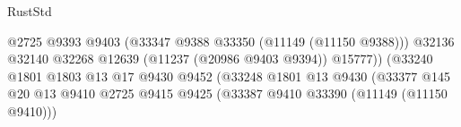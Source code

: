 \begin{lexlean}{RustStd}
\begin{coremodule}
                                                                @2725
                                                                @9393
                                                                @9403
                                                                (@33347
                                                                  @9388
                                                                  @33350
                                                                  (@11149 (@11150 @9388)))
                                                                @32136
                                                                @32140
                                                                @32268
                                                                @12639
                                                                (@11237 (@20986 @9403 @9394))
                                                                @15777))
                                                            (@33240
                                                              @1801
                                                              @1803
                                                              @13
                                                              @17
                                                              @9430
                                                              @9452
                                                              (@33248
                                                                @1801
                                                                @13
                                                                @9430
                                                                (@33377
                                                                  @145
                                                                  @20
                                                                  @13
                                                                  @9410
                                                                  @2725
                                                                  @9415
                                                                  @9425
                                                                  (@33387
                                                                    @9410
                                                                    @33390
                                                                    (@11149 (@11150 @9410)))

\end{coremodule}
\end{lexlean}
